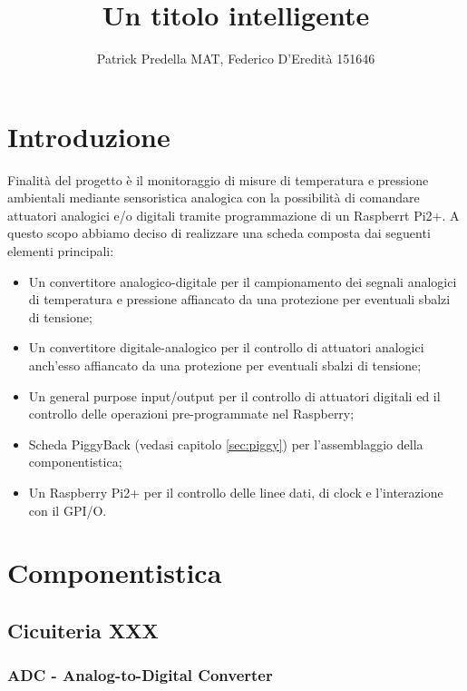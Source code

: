 \documentclass[10pt]{article}
\title{Un titolo intelligente}
\author{Patrick Predella MAT, Federico D'Eredità 151646 }
\date{}
\begin{document}
\maketitle
\tableofcontents

\section{Introduzione}
Finalità del progetto è il monitoraggio di misure di temperatura e pressione ambientali mediante sensoristica analogica con la possibilità di comandare attuatori analogici e/o digitali tramite programmazione di un Raspberrt Pi2+.
A questo scopo abbiamo deciso di realizzare una scheda composta dai seguenti elementi principali:
\begin{itemize}
\item Un convertitore analogico-digitale per il campionamento dei segnali analogici di temperatura e pressione affiancato da una protezione per eventuali sbalzi di tensione;
\item Un convertitore digitale-analogico per il controllo di attuatori analogici anch'esso affiancato da una protezione per eventuali sbalzi di tensione;
\item Un general purpose input/output per il controllo di attuatori digitali ed il controllo delle operazioni pre-programmate nel Raspberry;
\item Scheda PiggyBack (vedasi capitolo \ref{sec:piggy}) per l'assemblaggio della componentistica;
\item Un Raspberry Pi2+ per il controllo delle linee dati, di clock e l'interazione con il GPI/O.
\end{itemize}


\section{Componentistica}
	\subsection{Cicuiteria XXX} %

		\subsubsection{ADC - Analog-to-Digital Converter}\label{sec:adc}
	
\end{document}
